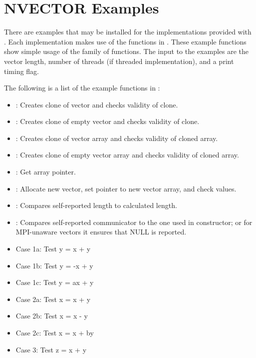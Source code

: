 \section{NVECTOR Examples}\label{ss:nvec_examples}

There are  examples that may be installed for the
implementations provided with {\sundials}. Each
implementation makes use of the functions in .
These example functions show simple usage of the  family
of functions. The input to the examples are the vector length, number
of threads (if threaded implementation), and a print timing flag.

\noindent The following is a list of the example functions in :
\begin{itemize}
\item {}: Creates clone of vector and checks validity of clone.
\item {}: Creates clone of empty vector and checks validity of clone.
\item {}: Creates clone of vector array and checks validity of cloned array.
\item {}: Creates clone of empty vector array and checks validity of cloned array.
\item {}: Get array pointer.
\item {}: Allocate new vector, set pointer to new vector array, and check values.
\item {}: Compares self-reported length to calculated length.
\item {}: Compares self-reported communicator to the one used in constructor; or for MPI-unaware vectors it ensures that NULL is reported.
\item {} Case 1a: Test y =  x + y
\item {} Case 1b: Test y = -x + y
\item {} Case 1c: Test y = ax + y
\item {} Case 2a: Test x =  x + y
\item {} Case 2b: Test x =  x - y
\item {} Case 2c: Test x =  x + by
\item {} Case 3:  Test z =  x + y

\end{itemize}
